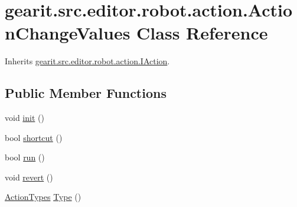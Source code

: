 \hypertarget{classgearit_1_1src_1_1editor_1_1robot_1_1action_1_1_action_change_values}{\section{gearit.\+src.\+editor.\+robot.\+action.\+Action\+Change\+Values Class Reference}
\label{classgearit_1_1src_1_1editor_1_1robot_1_1action_1_1_action_change_values}
}


Inherits \hyperlink{interfacegearit_1_1src_1_1editor_1_1robot_1_1action_1_1_i_action}{gearit.\+src.\+editor.\+robot.\+action.\+I\+Action}.

\subsection*{Public Member Functions}
\begin{DoxyCompactItemize}
\item 
void \hyperlink{classgearit_1_1src_1_1editor_1_1robot_1_1action_1_1_action_change_values_a661a8f37d6952555484abcc05eed3c1d}{init} ()
\item 
bool \hyperlink{classgearit_1_1src_1_1editor_1_1robot_1_1action_1_1_action_change_values_a798fffbfadeff508d9f3b3fdd9078914}{shortcut} ()
\item 
bool \hyperlink{classgearit_1_1src_1_1editor_1_1robot_1_1action_1_1_action_change_values_a364d4676ceb2938c644102bb9da9ea8d}{run} ()
\item 
void \hyperlink{classgearit_1_1src_1_1editor_1_1robot_1_1action_1_1_action_change_values_aaec9530ede31689ecf4d3ef99e589b5e}{revert} ()
\item 
\hyperlink{namespacegearit_1_1src_1_1editor_1_1robot_1_1action_a4be0fd46e3952d6135136b20e7b3fc5e}{Action\+Types} \hyperlink{classgearit_1_1src_1_1editor_1_1robot_1_1action_1_1_action_change_values_abe7d131d6cdb9aa7f7293567a078631e}{Type} ()
\end{DoxyCompactItemize}
